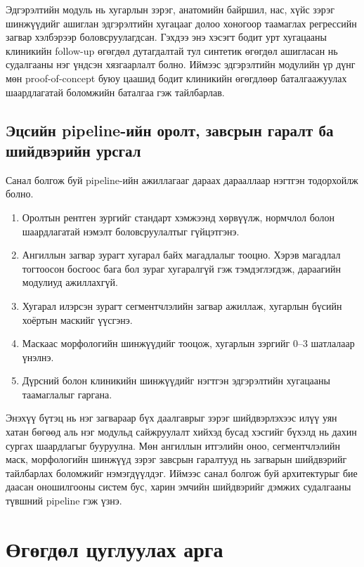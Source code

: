 Эдгэрэлтийн модуль нь хугарлын зэрэг, анатомийн байршил, нас, хүйс зэрэг шинжүүдийг ашиглан эдгэрэлтийн хугацааг долоо хоногоор таамаглах регрессийн загвар хэлбэрээр боловсруулагдсан. Гэхдээ энэ хэсэгт бодит урт хугацааны клиникийн follow-up өгөгдөл дутагдалтай тул синтетик өгөгдөл ашигласан нь судалгааны нэг үндсэн хязгаарлалт болно. Иймээс эдгэрэлтийн модулийн үр дүнг мөн proof-of-concept буюу цаашид бодит клиникийн өгөгдлөөр баталгаажуулах шаардлагатай боломжийн баталгаа гэж тайлбарлав.

\subsection{Эцсийн pipeline-ийн оролт, завсрын гаралт ба шийдвэрийн урсгал}

Санал болгож буй pipeline-ийн ажиллагааг дараах дарааллаар нэгтгэн тодорхойлж болно.

\begin{enumerate}[nosep]
    \item Оролтын рентген зургийг стандарт хэмжээнд хөрвүүлж, нормчлол болон шаардлагатай нэмэлт боловсруулалтыг гүйцэтгэнэ.
    \item Ангиллын загвар зурагт хугарал байх магадлалыг тооцно. Хэрэв магадлал тогтоосон босгоос бага бол зураг хугаралгүй гэж тэмдэглэгдэж, дараагийн модулиуд ажиллахгүй.
    \item Хугарал илэрсэн зурагт сегментчлэлийн загвар ажиллаж, хугарлын бүсийн хоёртын маскийг үүсгэнэ.
    \item Маскаас морфологийн шинжүүдийг тооцож, хугарлын зэргийг 0--3 шатлалаар үнэлнэ.
    \item Дүрсний болон клиникийн шинжүүдийг нэгтгэн эдгэрэлтийн хугацааны таамаглалыг гаргана.
\end{enumerate}

Энэхүү бүтэц нь нэг загвараар бүх даалгаврыг зэрэг шийдвэрлэхээс илүү уян хатан бөгөөд аль нэг модульд сайжруулалт хийхэд бусад хэсгийг бүхэлд нь дахин сургах шаардлагыг бууруулна. Мөн ангиллын итгэлийн оноо, сегментчлэлийн маск, морфологийн шинжүүд зэрэг завсрын гаралтууд нь загварын шийдвэрийг тайлбарлах боломжийг нэмэгдүүлдэг. Иймээс санал болгож буй архитектурыг бие даасан оношилгооны систем бус, харин эмчийн шийдвэрийг дэмжих судалгааны түвшний pipeline гэж үзнэ.


\section{Өгөгдөл цуглуулах арга}

